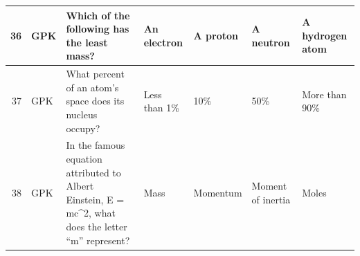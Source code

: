 \documentclass[10pt]{article}
\begin{document}
\begin{tiny}
\begin{longtable}{r|p{0.375in}|p{1.275in}|p{0.75in}|p{0.75in}|p{0.75in}|p{0.75in}}
    36    &      GPK &                                                                                                                                                                                                                                       Which of the following has the least mass? &                                                                                                                           An electron &                                                                                              A proton &                                                                                                                  A neutron &                                                                                                                   A hydrogen atom \\\hline
    37    &      GPK &                                                                                                                                                                                                                         What percent of an atom's space does its nucleus occupy? &                                                                                                                          Less than 1\% &                                                                                                   10\% &                                                                                                                        50\% &                                                                                                                     More than 90\% \\\hline
    38    &      GPK &                                                                                                                                                                              In the famous equation attributed to Albert Einstein, E = mc\textasciicircum 2, what does the letter ``m'' represent? &                                                                                                                                  Mass &                                                                                              Momentum &                                                                                                          Moment of inertia &                                                                                                                             Moles \\\hline

\end{longtable}
\end{tiny}
\end{document}
